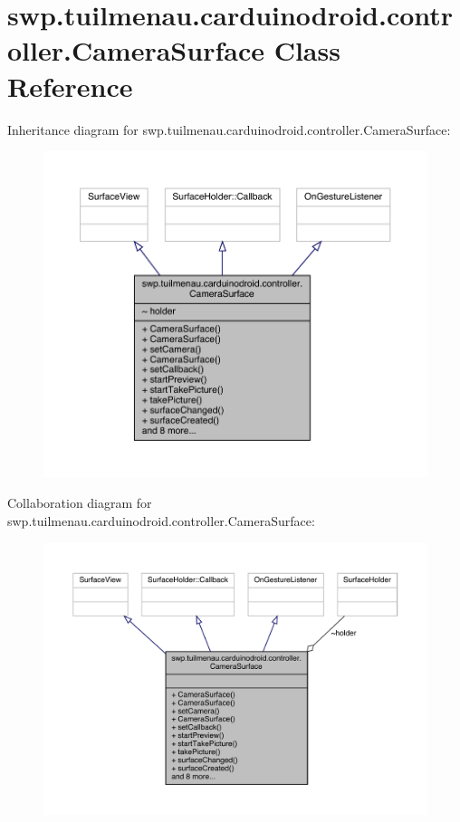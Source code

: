 \hypertarget{classswp_1_1tuilmenau_1_1carduinodroid_1_1controller_1_1_camera_surface}{}\section{swp.\+tuilmenau.\+carduinodroid.\+controller.\+Camera\+Surface Class Reference}
\label{classswp_1_1tuilmenau_1_1carduinodroid_1_1controller_1_1_camera_surface}


Inheritance diagram for swp.\+tuilmenau.\+carduinodroid.\+controller.\+Camera\+Surface\+:
\nopagebreak
\begin{figure}[H]
\begin{center}
\leavevmode
\includegraphics[width=350pt]{classswp_1_1tuilmenau_1_1carduinodroid_1_1controller_1_1_camera_surface__inherit__graph}
\end{center}
\end{figure}


Collaboration diagram for swp.\+tuilmenau.\+carduinodroid.\+controller.\+Camera\+Surface\+:
\nopagebreak
\begin{figure}[H]
\begin{center}
\leavevmode
\includegraphics[width=350pt]{classswp_1_1tuilmenau_1_1carduinodroid_1_1controller_1_1_camera_surface__coll__graph}
\end{center}
\end{figure}
